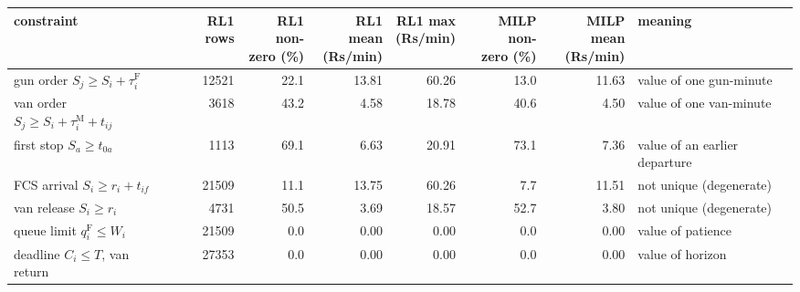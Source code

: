 \begin{tabular}{@{}lrrrrrrp{3.0cm}@{}}
\toprule
constraint & RL1 rows & \shortstack[r]{RL1 non-\\zero (\%)} & \shortstack[r]{RL1 mean\\(Rs/min)} & \shortstack[r]{RL1 max\\(Rs/min)} & \shortstack[r]{MILP non-\\zero (\%)} & \shortstack[r]{MILP mean\\(Rs/min)} & meaning \\
\midrule
gun order $S_j\ge S_i+\tau^{\mathrm F}_i$ & 12521 & 22.1 & 13.81 & 60.26 & 13.0 & 11.63 & value of one gun-minute \\
van order $S_j\ge S_i+\tau^{\mathrm M}_i+t_{ij}$ & 3618 & 43.2 & 4.58 & 18.78 & 40.6 & 4.50 & value of one van-minute \\
first stop $S_a\ge t_{0a}$ & 1113 & 69.1 & 6.63 & 20.91 & 73.1 & 7.36 & value of an earlier departure \\
FCS arrival $S_i\ge r_i+t_{if}$ & 21509 & 11.1 & 13.75 & 60.26 & 7.7 & 11.51 & not unique (degenerate) \\
van release $S_i\ge r_i$ & 4731 & 50.5 & 3.69 & 18.57 & 52.7 & 3.80 & not unique (degenerate) \\
queue limit $q^{\mathrm F}_i\le W_i$ & 21509 & 0.0 & 0.00 & 0.00 & 0.0 & 0.00 & value of patience \\
deadline $C_i\le T$, van return & 27353 & 0.0 & 0.00 & 0.00 & 0.0 & 0.00 & value of horizon \\
\bottomrule
\end{tabular}
